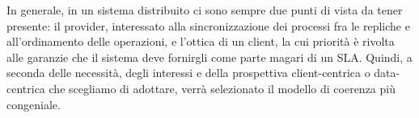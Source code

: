 \documentclass[twoside]{article}
\begin{document}
\begin{multicols}{2}
In generale, in un sistema distribuito ci sono sempre due punti di vista da tener presente: il provider, interessato alla sincronizzazione dei processi fra le repliche e all'ordinamento delle operazioni, e l'ottica di un client, la cui priorità è rivolta alle garanzie che il sistema deve fornirgli come parte magari di un SLA. Quindi, a seconda delle necessità, degli interessi e della prospettiva client-centrica o data-centrica che scegliamo di adottare, verrà selezionato il modello di coerenza più congeniale.

\label{sec:conclusioni}

\printbibliography


\end{multicols}
\end{document}
